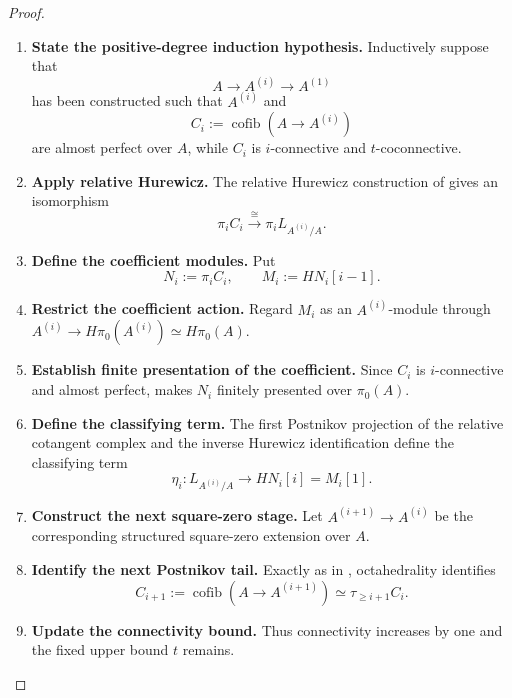 \begin{proof}
\begin{enumerate}[label=\textup{(\arabic*)}]
\[    \]
    is almost perfect over \(A\), because \(A\) is perfect over itself.
    As in , \(C_1\) is
    \(1\)-connective and eventually coconnective; choose \(t\) such that it is
    \(t\)-coconnective.
    \item \textbf{State the positive-degree induction hypothesis.}
    Inductively suppose that
    \[
        A\longrightarrow A^{(i)}\longrightarrow A^{(1)}
    \]
    has been constructed such that \(A^{(i)}\) and
    \[
        C_i:=\operatorname{cofib}(A\to A^{(i)})
    \]
    are almost perfect over \(A\), while \(C_i\) is \(i\)-connective and
    \(t\)-coconnective.
    \item \textbf{Apply relative Hurewicz.}
    The relative Hurewicz construction of
     gives an isomorphism
    \[
        \pi_iC_i
        \xrightarrow{\cong}
        \pi_iL_{A^{(i)}/A}.
    \]
    \item \textbf{Define the coefficient modules.}
    Put
    \[
        N_i:=\pi_iC_i,
        \qquad
        M_i:=HN_i[i-1].
    \]
    \item \textbf{Restrict the coefficient action.}
    Regard \(M_i\) as an \(A^{(i)}\)-module through
    \(A^{(i)}\to H\pi_0(A^{(i)})\simeq H\pi_0(A)\).
    \item \textbf{Establish finite presentation of the coefficient.}
    Since \(C_i\) is
    \(i\)-connective and almost perfect,
     makes \(N_i\) finitely
    presented over \(\pi_0(A)\).
    \item \textbf{Define the classifying term.}
    The first Postnikov projection of the relative
    cotangent complex and the inverse Hurewicz identification define the
    classifying term
    \[
        \eta_i:
        L_{A^{(i)}/A}
        \longrightarrow
        HN_i[i]
        =M_i[1].
    \]
    \item \textbf{Construct the next square-zero stage.}
    Let \(A^{(i+1)}\to A^{(i)}\) be the corresponding structured square-zero
    extension over \(A\).
    \item \textbf{Identify the next Postnikov tail.}
    Exactly as in
    , octahedrality identifies
    \[
        C_{i+1}:=\operatorname{cofib}(A\to A^{(i+1)})
        \simeq
        \tau_{\geq i+1}C_i.
    \]
    \item \textbf{Update the connectivity bound.}
    Thus connectivity increases by one and the fixed upper bound \(t\) remains.

\end{enumerate}
\end{proof}
